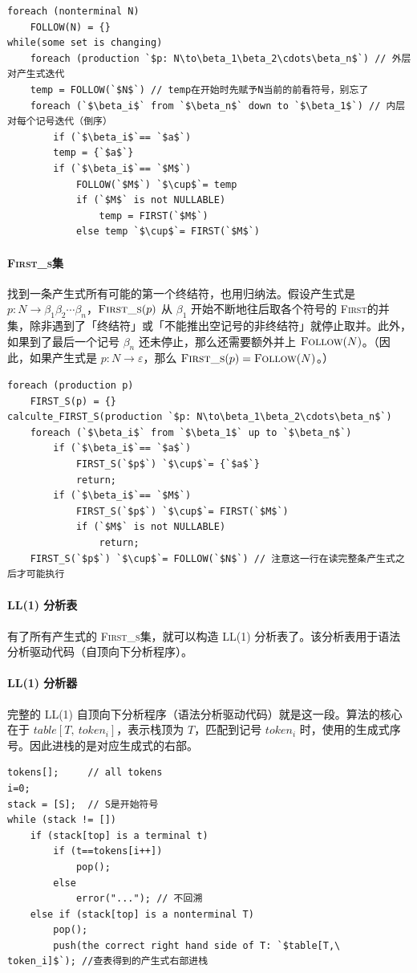 \documentclass[UTF8]{ctexart}
\newcommand\FIRST{\textsc{First}}
\newcommand\FOLLOW{\textsc{Follow}}
\newcommand\FIRSTS{\textsc{First\_s}}
\newcommand\Emph[1]{\textcolor{cyan!80!black}{#1}}
\newcommand\Notes[1]{\textcolor{yellow!50!black}{\small #1}}
\begin{document}
\begin{lstlisting}
foreach (nonterminal N)
    FOLLOW(N) = {}
while(some set is changing)
    foreach (production `$p: N\to\beta_1\beta_2\cdots\beta_n$`) // 外层对产生式迭代
    temp = FOLLOW(`$N$`) // temp在开始时先赋予N当前的前看符号，别忘了
    foreach (`$\beta_i$` from `$\beta_n$` down to `$\beta_1$`) // 内层对每个记号迭代（倒序）
        if (`$\beta_i$`== `$a$`)
        temp = {`$a$`}
        if (`$\beta_i$`== `$M$`)
            FOLLOW(`$M$`) `$\cup$`= temp
            if (`$M$` is not NULLABLE)
                temp = FIRST(`$M$`)
            else temp `$\cup$`= FIRST(`$M$`)
\end{lstlisting}

\paragraph{\FIRSTS 集} 找到一条产生式所有可能的第一个终结符，也用归纳法。假设产生式是 $p:N\to \beta_1\beta_2\cdots\beta_n$，$\FIRSTS(p)$ 从 $\beta_1$ 开始不断地往后取各个符号的 \FIRST 的并集，除非遇到了「终结符」或「不能推出空记号的非终结符」就停止取并。此外，如果到了最后一个记号 $\beta_n$ 还未停止，那么还需要额外并上 $\FOLLOW(N)$。\Notes{（因此，如果产生式是 $p:N\to\varepsilon$，那么 $\FIRSTS(p)=\FOLLOW(N)$。）}
\begin{lstlisting}
foreach (production p)
    FIRST_S(p) = {}
calculte_FIRST_S(production `$p: N\to\beta_1\beta_2\cdots\beta_n$`)
    foreach (`$\beta_i$` from `$\beta_1$` up to `$\beta_n$`)
        if (`$\beta_i$`== `$a$`)
            FIRST_S(`$p$`) `$\cup$`= {`$a$`}
            return;
        if (`$\beta_i$`== `$M$`)
            FIRST_S(`$p$`) `$\cup$`= FIRST(`$M$`)
            if (`$M$` is not NULLABLE)
                return;
    FIRST_S(`$p$`) `$\cup$`= FOLLOW(`$N$`) // 注意这一行在读完整条产生式之后才可能执行
\end{lstlisting}

\paragraph{LL(1) 分析表} 有了所有产生式的 \FIRSTS 集，就可以构造 LL(1) 分析表了。该分析表用于语法分析驱动代码（自顶向下分析程序）。

\paragraph{LL(1) 分析器} 完整的 LL(1) 自顶向下分析程序（语法分析驱动代码）就是这一段。算法的核心在于\Emph{ $table[T,\ token_i]$}，表示栈顶为 $T$，匹配到记号 $token_i$ 时，使用的生成式序号。因此进栈的是对应生成式的右部。
\begin{lstlisting}
tokens[];     // all tokens
i=0;
stack = [S];  // S是开始符号
while (stack != [])
    if (stack[top] is a terminal t)
        if (t==tokens[i++])
            pop();
        else
            error("..."); // 不回溯
    else if (stack[top] is a nonterminal T)
        pop();
        push(the correct right hand side of T: `$table[T,\ token_i]$`); //查表得到的产生式右部进栈
\end{lstlisting}
\end{document}
